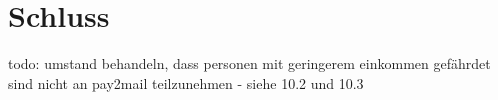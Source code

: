 
\chapter{Schluss}
\label{Schluss}

todo: umstand behandeln, dass personen mit geringerem einkommen gefährdet sind nicht an pay2mail teilzunehmen - siehe 10.2 und 10.3